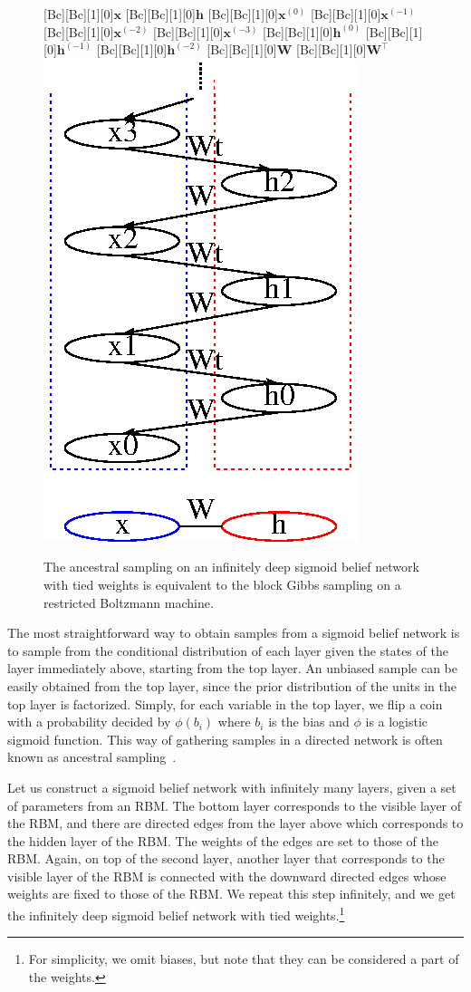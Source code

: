 \documentclass{now}
\newcommand{\vect}[1]{\mathbf{#1}}
\newcommand{\matr}[1]{\mathbf{#1}}
\newcommand{\vh}[0]{\vect{h}}
\newcommand{\vx}[0]{\vect{x}}
\newcommand{\mW}[0]{\matr{W}}
\begin{document}
\begin{figure}
    \centering
    [Bc][Bc][1][0]{$\vx$}
    [Bc][Bc][1][0]{$\vh$}
    [Bc][Bc][1][0]{$\vx^{(0)}$}
    [Bc][Bc][1][0]{$\vx^{(-1)}$}
    [Bc][Bc][1][0]{$\vx^{(-2)}$}
    [Bc][Bc][1][0]{$\vx^{(-3)}$}
    [Bc][Bc][1][0]{$\vh^{(0)}$}
    [Bc][Bc][1][0]{$\vh^{(-1)}$}
    [Bc][Bc][1][0]{$\vh^{(-2)}$}
    [Bc][Bc][1][0]{$\mW$}
    [Bc][Bc][1][0]{$\mW^\top$}
    \includegraphics[width=0.4\columnwidth]{../figures/rbm_dbn.eps}
    \caption{The ancestral sampling on an infinitely deep sigmoid belief network
    with tied weights is equivalent to the block Gibbs sampling on a restricted
Boltzmann machine.}
    \label{fig:inf_sbn}
\end{figure}

The most straightforward way to obtain samples from a sigmoid belief network is
to sample from the conditional distribution of each layer given the states of
the layer immediately above, starting from the top layer. An unbiased sample can
be easily obtained from the top layer, since the prior distribution of the units
in the top layer is factorized. Simply, for each variable in the top layer, we
flip a coin with a probability decided by $\phi(b_i)$ where $b_i$ is the bias
and $\phi$ is a logistic sigmoid function. This way of gathering samples in a
directed network is often known as ancestral sampling~\citep[see,
e.g.,][]{Bishop2006,Murphy2012}.

Let us construct a sigmoid belief network with infinitely many layers, given a
set of parameters from an RBM. The bottom layer corresponds to the visible layer
of the RBM, and there are directed edges from the layer above which corresponds
to the hidden layer of the RBM. The weights of the edges are set to those of the
RBM. Again, on top of the second layer, another layer that corresponds to the
visible layer of the RBM is connected with the downward directed edges whose
weights are fixed to those of the RBM. We repeat this step infinitely, and we
get the infinitely deep sigmoid belief network with tied weights.\footnote{
    For simplicity, we omit biases, but note that they can be considered a part
    of the weights.
}
\end{document}
